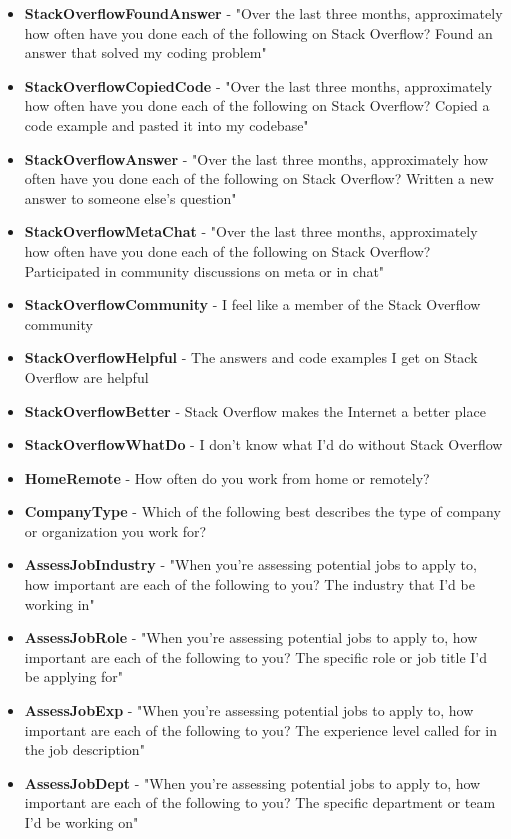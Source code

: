 \begin{appendices}
\begin{itemize}
        \item \textbf{StackOverflowFoundAnswer} - "Over the last three months, approximately how often have you done each of the following on Stack Overflow? Found an answer that solved my coding problem"
        \item \textbf{StackOverflowCopiedCode} - "Over the last three months, approximately how often have you done each of the following on Stack Overflow? Copied a code example and pasted it into my codebase"
        \item \textbf{StackOverflowAnswer} - "Over the last three months, approximately how often have you done each of the following on Stack Overflow? Written a new answer to someone else's question"
        \item \textbf{StackOverflowMetaChat} - "Over the last three months, approximately how often have you done each of the following on Stack Overflow? Participated in community discussions on meta or in chat"
        \item \textbf{StackOverflowCommunity} - I feel like a member of the Stack Overflow community
        \item \textbf{StackOverflowHelpful} - The answers and code examples I get on Stack Overflow are helpful
        \item \textbf{StackOverflowBetter} - Stack Overflow makes the Internet a better place
        \item \textbf{StackOverflowWhatDo} - I don't know what I'd do without Stack Overflow
        \item \textbf{HomeRemote} - How often do you work from home or remotely?
        \item \textbf{CompanyType} - Which of the following best describes the type of company or organization you work for?
        \item \textbf{AssessJobIndustry} - "When you're assessing potential jobs to apply to, how important are each of the following to you? The industry that I'd be working in"
        \item \textbf{AssessJobRole} - "When you're assessing potential jobs to apply to, how important are each of the following to you? The specific role or job title I'd be applying for"
        \item \textbf{AssessJobExp} - "When you're assessing potential jobs to apply to, how important are each of the following to you? The experience level called for in the job description"
        \item \textbf{AssessJobDept} - "When you're assessing potential jobs to apply to, how important are each of the following to you? The specific department or team I'd be working on"

\end{itemize}
\end{appendices}
